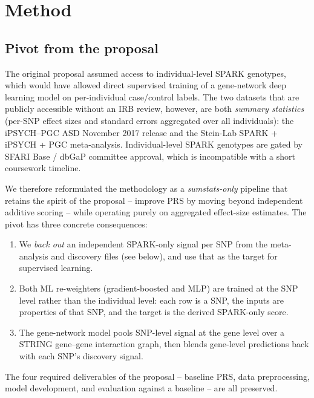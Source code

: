 \section{Method}
\label{sec:method}

\subsection{Pivot from the proposal}
\label{sec:pivot}

The original proposal assumed access to individual-level SPARK
genotypes, which would have allowed direct supervised training of a
gene-network deep learning model on per-individual case/control
labels. The two datasets that are publicly accessible without an IRB
review, however, are both \emph{summary statistics} (per-SNP effect
sizes and standard errors aggregated over all individuals): the
iPSYCH--PGC ASD November 2017 release and the Stein-Lab SPARK + iPSYCH
+ PGC meta-analysis. Individual-level SPARK genotypes are gated by
SFARI Base / dbGaP committee approval, which is incompatible with a
short coursework timeline.

We therefore reformulated the methodology as a \emph{sumstats-only}
pipeline that retains the spirit of the proposal -- improve PRS by
moving beyond independent additive scoring -- while operating purely
on aggregated effect-size estimates. The pivot has three concrete
consequences:

\begin{enumerate}[nosep,leftmargin=1.4em]
  \item We \emph{back out} an independent SPARK-only signal per SNP
        from the meta-analysis and discovery files (see below), and
        use that as the target for supervised learning.
  \item Both ML re-weighters (gradient-boosted and MLP) are trained at
        the SNP level rather than the individual level: each row is a
        SNP, the inputs are properties of that SNP, and the target is
        the derived SPARK-only score.
  \item The gene-network model pools SNP-level signal at the gene
        level over a STRING gene--gene interaction graph, then blends
        gene-level predictions back with each SNP's discovery signal.
\end{enumerate}

The four required deliverables of the proposal -- baseline PRS, data
preprocessing, model development, and evaluation against a baseline --
are all preserved.

